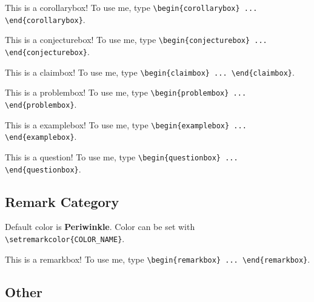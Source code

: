 \documentclass{scrartcl}
\begin{document}
\begin{corollarybox}
    This is a corollarybox! To use me, type \verb#\begin{corollarybox} ... \end{corollarybox}#.
\end{corollarybox}
\begin{conjecturebox}
    This is a conjecturebox! To use me, type \verb#\begin{conjecturebox} ... \end{conjecturebox}#.
\end{conjecturebox}
\begin{claimbox}
    This is a claimbox! To use me, type \verb#\begin{claimbox} ... \end{claimbox}#.
\end{claimbox}
\begin{problembox}
    This is a problembox!  To use me, type \verb#\begin{problembox} ... \end{problembox}#.
\end{problembox}
\begin{examplebox}
    This is a examplebox!  To use me, type \verb#\begin{examplebox} ... \end{examplebox}#.
\end{examplebox}
\begin{questionbox}
    This is a question!  To use me, type \verb#\begin{questionbox} ... \end{questionbox}#.
\end{questionbox}

\subsection{Remark Category}

Default color is \textbf{Periwinkle}. Color can be set with \verb#\setremarkcolor{COLOR_NAME}#. 

\begin{remarkbox}
    This is a remarkbox!  To use me, type \verb#\begin{remarkbox} ... \end{remarkbox}#.
\end{remarkbox}

\subsection{Other}
\end{document}

